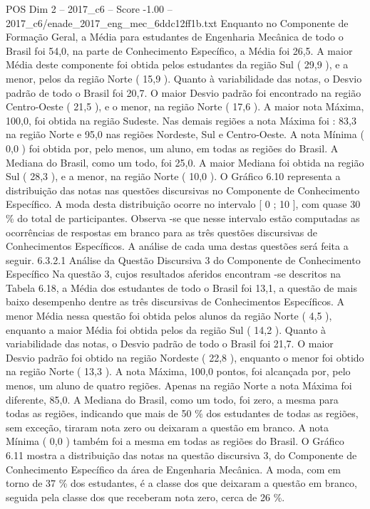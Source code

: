 \begin{textsample}{POS Dim 2 – 2017\_c6 – Score -1.00 – 2017\_c6/enade\_2017\_eng\_mec\_6ddc12ff1b.txt}
Enquanto no Componente de Formação Geral, a Média para estudantes de Engenharia Mecânica de todo o Brasil foi 54,0, na parte de Conhecimento Específico, a Média foi 26,5.
A maior Média deste componente foi obtida pelos estudantes da região Sul ( 29,9 ), e a menor, pelos da região Norte ( 15,9 ).
Quanto à variabilidade das notas, o Desvio padrão de todo o Brasil foi 20,7.
O maior Desvio padrão foi encontrado na região Centro-Oeste ( 21,5 ), e o menor, na região Norte ( 17,6 ).
A maior nota Máxima, 100,0, foi obtida na região Sudeste.
Nas demais regiões a nota Máxima foi : 83,3 na região Norte e 95,0 nas regiões Nordeste, Sul e Centro-Oeste.
A nota Mínima ( 0,0 ) foi obtida por, pelo menos, um aluno, em todas as regiões do Brasil.
A Mediana do Brasil, como um todo, foi 25,0.
A maior Mediana foi obtida na região Sul ( 28,3 ), e a menor, na região Norte ( 10,0 ).
O Gráfico 6.10 representa a distribuição das notas nas questões discursivas no Componente de Conhecimento Específico.
A moda desta distribuição ocorre no intervalo [ 0 ; 10 ], com quase 30 \% do total de participantes.
Observa -se que nesse intervalo estão computadas as ocorrências de respostas em branco para as três questões discursivas de Conhecimentos Específicos.
A análise de cada uma destas questões será feita a seguir. 6.3.2.1 Análise da Questão Discursiva 3 do Componente de Conhecimento Específico Na questão 3, cujos resultados aferidos encontram -se descritos na Tabela 6.18, a Média dos estudantes de todo o Brasil foi 13,1, a questão de mais baixo desempenho dentre as três discursivas de Conhecimentos Específicos.
A menor Média nessa questão foi obtida pelos alunos da região Norte ( 4,5 ), enquanto a maior Média foi obtida pelos da região Sul ( 14,2 ).
Quanto à variabilidade das notas, o Desvio padrão de todo o Brasil foi 21,7.
O maior Desvio padrão foi obtido na região Nordeste ( 22,8 ), enquanto o menor foi obtido na região Norte ( 13,3 ).
A nota Máxima, 100,0 pontos, foi alcançada por, pelo menos, um aluno de quatro regiões.
Apenas na região Norte a nota Máxima foi diferente, 85,0.
A Mediana do Brasil, como um todo, foi zero, a mesma para todas as regiões, indicando que mais de 50 \% dos estudantes de todas as regiões, sem exceção, tiraram nota zero ou deixaram a questão em branco.
A nota Mínima ( 0,0 ) também foi a mesma em todas as regiões do Brasil.
O Gráfico 6.11 mostra a distribuição das notas na questão discursiva 3, do Componente de Conhecimento Específico da área de Engenharia Mecânica.
A moda, com em torno de 37 \% dos estudantes, é a classe dos que deixaram a questão em branco, seguida pela classe dos que receberam nota zero, cerca de 26 \%.

\end{textsample}
